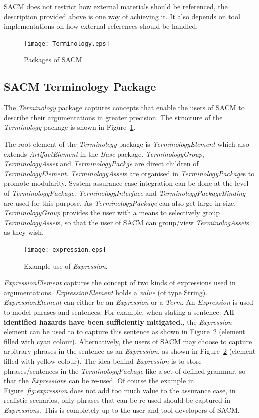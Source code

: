 SACM does not restrict how external materials should be referenced, the description provided above is one way of achieving it. It also depends on tool implementations on how external references should be handled. 
\begin{figure}[ht!]
	\centering
	\texttt{[image: Terminology.eps]}
	\caption{Packages of SACM}
	\label{fig:term}
\end{figure}
\subsection{SACM Terminology Package}
\label{sec:termPack}
The \textit{Terminology} package captures concepts that enable the users of SACM to describe their argumentations in greater precision. The structure of the \textit{Terminology} package is shown in Figure~\ref{fig:term}.

The root element of the \textit{Terminology} package is \textit{TerminologyElement} which also extends \textit{ArtifactElement} in the \textit{Base} package. \textit{TerminologyGroup}, \textit{TerminologyAsset} and \textit{TerminologyPackge} are direct children of \textit{TerminologyElement}. \textit{TerminologyAsset}s are organised in \textit{TerminologyPackage}s to promote modularity. System assurance case integration can be done at the level of \textit{TerminologyPackage}. \textit{TerminologyInterface} and \textit{TerminologyPackageBinding} are used for this purpose. 
As \textit{TerminologyPackage} can also get large in size, \textit{TerminologyGroup} provides the user with a means to selectively group \textit{TerminologyAsset}s, so that the user of SACM can group/view \textit{TerminologAsset}s as they wish.

\begin{figure}
	\centering
	\texttt{[image: expression.eps]}
	\caption{Example use of \textit{Expression}.}
	\label{fig:expression}
\end{figure}

\textit{ExpressionElement} captures the concept of two kinds of expressions used in argumentations. \textit{ExpressionElement} holds a \textit{value} (of type String). \textit{ExpressionElement} can either be an \textit{Expression} or a \textit{Term}. An \textit{Expression} is used to model phrases and sentences. For example, when stating a sentence: \textbf{All identified hazards have been sufficiently mitigated.}, the \textit{Expression} element can be used to to capture this sentence as shown in Figure~\ref{fig:expression} (element filled with cyan colour). Alternatively, the users of SACM may choose to capture arbitrary phrases in the sentence as an \textit{Expression}, as shown in Figure~\ref{fig:expression} (element filled with yellow colour). The idea behind \textit{Expression} is to store phrases/sentences in the \textit{TerminologyPackage} like a set of defined grammar, so that the \textit{Expression}s can be re-used. Of course the example in Figure~\textit{fig:expression} does not add too much value to the assurance case, in realistic scenarios, only phrases that can be re-used should be captured in \textit{Expression}s. This is completely up to the user and tool developers of SACM. 

